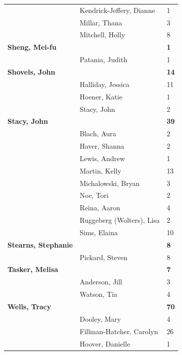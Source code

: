 \documentclass{article}\usepackage[]{graphicx}\usepackage[]{color}
\begin{document}
{\begin{longtable} { >{\raggedright}p{}|p{}p{}}
   & Kendrick-Jeffery, Dianne & 1 \\ 
   & Millar, Thana & 3 \\ 
   \rowcolor[gray]{0.90} & Mitchell, Holly & 8 \\ 
   \rowcolor[gray]{0.90}\textbf{Sheng, Mei-fu} &  & \hspace{2cm}\textbf{1} \\ 
   \rowcolor[gray]{0.90} & Patania, Judith & 1 \\ 
  \textbf{Shovels, John} &  & \hspace{2cm}\textbf{14} \\ 
   & Halliday, Jessica & 11 \\ 
   & Hoener, Katie & 1 \\ 
   \rowcolor[gray]{0.90} & Stacy, John & 2 \\ 
   \rowcolor[gray]{0.90}\textbf{Stacy, John} &  & \hspace{2cm}\textbf{39} \\ 
   \rowcolor[gray]{0.90} & Blach, Aura & 2 \\ 
   & Haver, Shanna & 2 \\ 
   & Lewis, Andrew & 1 \\ 
   & Martin, Kelly & 13 \\ 
   \rowcolor[gray]{0.90} & Michalowski, Bryan & 3 \\ 
   \rowcolor[gray]{0.90} & Noe, Tori & 2 \\ 
   \rowcolor[gray]{0.90} & Reina, Aaron & 4 \\ 
   & Ruggeberg (Wolters), Lisa & 2 \\ 
   & Sims, Elaina & 10 \\ 
  \textbf{Stearns, Stephanie} &  & \hspace{2cm}\textbf{8} \\ 
   \rowcolor[gray]{0.90} & Pickard, Steven & 8 \\ 
   \rowcolor[gray]{0.90}\textbf{Tasker, Melisa} &  & \hspace{2cm}\textbf{7} \\ 
   \rowcolor[gray]{0.90} & Anderson, Jill & 3 \\ 
   & Watson, Tia & 4 \\ 
  \textbf{Wells, Tracy} &  & \hspace{2cm}\textbf{70} \\ 
   & Dooley, Mary & 4 \\ 
   \rowcolor[gray]{0.90} & Fillman-Hatcher, Carolyn & 26 \\ 
   \rowcolor[gray]{0.90} & Hoover, Danielle & 1 \\ 

\end{longtable}}
\end{document}
